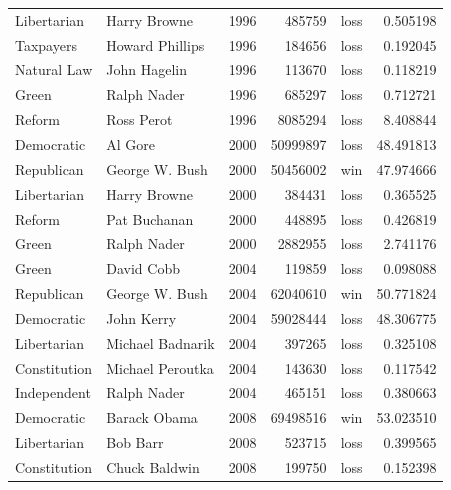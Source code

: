 \documentclass[
  letterpaper,
  DIV=11,
  numbers=noendperiod]{scrreprt}
\begin{document}
\begin{tabular}{llrrlr}
Libertarian           &            Harry Browne &  1996 &        485759 &   loss &   0.505198 \\
Taxpayers             &         Howard Phillips &  1996 &        184656 &   loss &   0.192045 \\
Natural Law           &            John Hagelin &  1996 &        113670 &   loss &   0.118219 \\
Green                 &             Ralph Nader &  1996 &        685297 &   loss &   0.712721 \\
Reform                &              Ross Perot &  1996 &       8085294 &   loss &   8.408844 \\
Democratic            &                 Al Gore &  2000 &      50999897 &   loss &  48.491813 \\
Republican            &          George W. Bush &  2000 &      50456002 &    win &  47.974666 \\
Libertarian           &            Harry Browne &  2000 &        384431 &   loss &   0.365525 \\
Reform                &            Pat Buchanan &  2000 &        448895 &   loss &   0.426819 \\
Green                 &             Ralph Nader &  2000 &       2882955 &   loss &   2.741176 \\
Green                 &              David Cobb &  2004 &        119859 &   loss &   0.098088 \\
Republican            &          George W. Bush &  2004 &      62040610 &    win &  50.771824 \\
Democratic            &              John Kerry &  2004 &      59028444 &   loss &  48.306775 \\
Libertarian           &        Michael Badnarik &  2004 &        397265 &   loss &   0.325108 \\
Constitution          &        Michael Peroutka &  2004 &        143630 &   loss &   0.117542 \\
Independent           &             Ralph Nader &  2004 &        465151 &   loss &   0.380663 \\
Democratic            &            Barack Obama &  2008 &      69498516 &    win &  53.023510 \\
Libertarian           &                Bob Barr &  2008 &        523715 &   loss &   0.399565 \\
Constitution          &           Chuck Baldwin &  2008 &        199750 &   loss &   0.152398 \\

\end{tabular}
\end{document}
